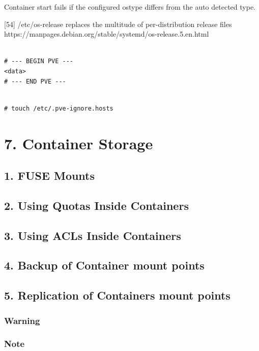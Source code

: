Container start fails if the configured ostype differs from the auto detected type.

[54] /etc/os-release replaces the multitude of per-distribution release files https://manpages.debian.org/stable/systemd/os-release.5.en.html

\begin{lstlisting}

# --- BEGIN PVE ---
<data>
# --- END PVE ---

\end{lstlisting}

\begin{lstlisting}

# touch /etc/.pve-ignore.hosts

\end{lstlisting}


\section{7. Container Storage}

\subsection{1. FUSE Mounts}

\subsection{2. Using Quotas Inside Containers}

\subsection{3. Using ACLs Inside Containers}

\subsection{4. Backup of Container mount points}

\subsection{5. Replication of Containers mount points}

\subsubsection{Warning}

\subsubsection{Note}

